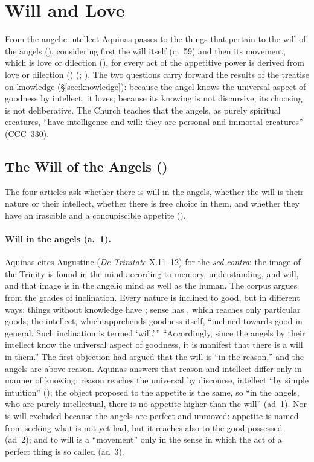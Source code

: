 \section{Will and Love}\label{sec:will}

From the angelic intellect Aquinas passes to the things that pertain to
the will of the angels (), considering first the will itself (q.~59) and then its
movement, which is love or dilection (), for every act of the appetitive power is derived from
love or dilection () (; ).
The two questions carry forward the results of the treatise on knowledge
(\S\ref{sec:knowledge}): because the angel knows the universal aspect of
goodness by intellect, it loves; because its knowing is not discursive,
its choosing is not deliberative. The Church teaches that the angels, as
purely spiritual creatures, ``have intelligence and will: they are
personal and immortal creatures'' (CCC~330).

\subsection{The Will of the Angels ()}\label{sec:q59}

The four articles ask whether there is will in the angels, whether the
will is their nature or their intellect, whether there is free choice in
them, and whether they have an irascible and a concupiscible appetite
().

\paragraph{Will in the angels (a.~1).} Aquinas cites Augustine (\emph{De
Trinitate} X.11--12) for the \emph{sed contra}: the image of the Trinity
is found in the mind according to memory, understanding, and will, and
that image is in the angelic mind as well as the human. The corpus argues
from the grades of inclination. Every nature is inclined to good, but in
different ways: things without knowledge have ; sense has , which reaches only
particular goods; the intellect, which apprehends goodness itself,
``inclined towards good in general. Such inclination is termed `will.'\,''
``Accordingly, since the angels by their intellect know the universal
aspect of goodness, it is manifest that there is a will in them.'' The
first objection had argued that the will is ``in the reason,'' and the
angels are above reason. Aquinas answers that reason and intellect differ
only in manner of knowing: reason reaches the universal by discourse,
intellect ``by simple intuition'' (); the object
proposed to the appetite is the same, so ``in the
angels, who are purely intellectual, there is no appetite higher than the
will'' (ad~1). Nor is will excluded because the angels are perfect and
unmoved: appetite is named from seeking what is not yet had, but it
reaches also to the good possessed (ad~2); and to will is a ``movement''
only in the sense in which the act of a perfect thing is so called
(ad~3).


